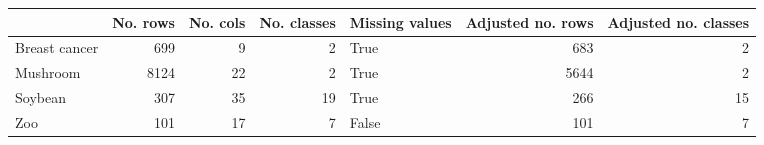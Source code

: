 \begin{tabular}{lrrrlrr}
\toprule
{} &  No. rows &  No. cols &  No. classes &  Missing values &  Adjusted no. rows &  Adjusted no. classes \\
\midrule
Breast cancer &       699 &         9 &            2 &            True &                683 &                     2 \\
Mushroom      &      8124 &        22 &            2 &            True &               5644 &                     2 \\
Soybean       &       307 &        35 &           19 &            True &                266 &                    15 \\
Zoo           &       101 &        17 &            7 &           False &                101 &                     7 \\
\bottomrule
\end{tabular}
